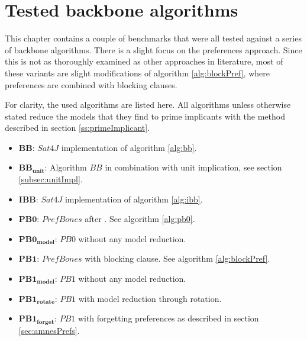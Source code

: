\section{Tested backbone algorithms}

This chapter contains a couple of benchmarks that were all tested against a series of backbone algorithms. There is a slight focus on the preferences approach. Since this is not as thoroughly examined as other approaches in literature, most of these variants are slight modifications of algorithm \ref{alg:blockPref}, where preferences are combined with blocking clauses.

For clarity, the used algorithms are listed here. All algorithms unless otherwise stated reduce the models that they find to prime implicants with the method described in section \ref{ss:primeImplicant}.
\begin{itemize}
\setlength\itemsep{0.2em}
\item $\boldsymbol{BB}$: $Sat4J$ implementation of algorithm \ref{alg:bb}.
\item $\boldsymbol{BB_{unit}}$: Algorithm $BB$ in combination with unit implication, see section \ref{subsec:unitImpl}.
\item $\boldsymbol{IBB}$: $Sat4J$ implementation of algorithm \ref{alg:ibb}.
\item $\boldsymbol{PB0}$: $PrefBones$ after \cite{PJ18}. See algorithm \ref{alg:pb0}.
\item $\boldsymbol{PB0_{model}}$: $PB0$ without any model reduction.
\item $\boldsymbol{PB1}$: $PrefBones$ with blocking clause. See algorithm \ref{alg:blockPref}.
\item $\boldsymbol{PB1_{model}}$: $PB1$ without any model reduction.
\item $\boldsymbol{PB1_{rotate}}$: $PB1$ with model reduction through rotation. 
\item $\boldsymbol{PB1_{forget}}$: $PB1$ with forgetting preferences as described in section \ref{sec:amnesPrefs}.

\end{itemize}
